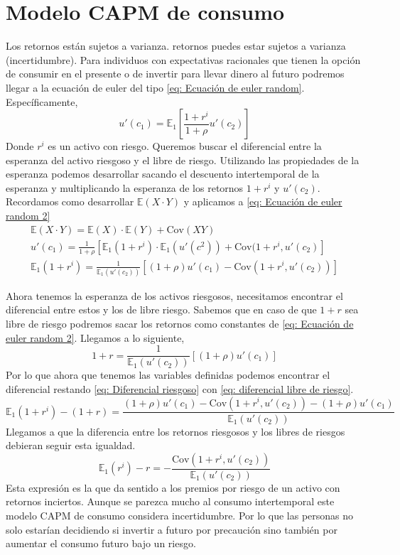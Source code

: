\section{Modelo CAPM de consumo}
Los retornos están sujetos a varianza. retornos puedes estar sujetos a varianza (incertidumbre). Para individuos con expectativas racionales que tienen la opción de consumir en el presente o de invertir para llevar dinero al futuro podremos llegar a la ecuación de euler del tipo \ref{eq: Ecuación de euler random}. Específicamente,
\begin{equation}
    u'(c_1) = \mathbb{E}_1  \left[  \frac{1+r^i}{1+\rho} u'(c_2)  \right] \label{eq: Ecuación de euler random 2}
\end{equation}
Donde $r^i$ es un activo con riesgo. Queremos buscar el diferencial entre la esperanza del activo riesgoso y el libre de riesgo. Utilizando las propiedades de la esperanza podemos desarrollar sacando el descuento intertemporal de la esperanza y multiplicando la esperanza de los retornos $1+r^i$ y $u'(c_2)$. Recordamos como desarrollar $\mathbb{E}(X\cdot Y)$ y aplicamos a \ref{eq: Ecuación de euler random 2}
\begin{align}
    \mathbb{E}(X\cdot Y) = \mathbb{E}(X) \cdot \mathbb{E}(Y) + \text{Cov}(XY) \\
    u'(c_1) = \frac{1}{1+\rho} \left[ \mathbb{E}_1(1+r^i) \cdot \mathbb{E}_1 (u'(c^2)) + \text{Cov}(1 + r^i, u'(c_2)       \right] \\
    \mathbb{E}_1 (1+r^i) = \frac {1}{\mathbb{E}_1 (u'(c_2))} \left[   (1+\rho)u'(c_1) - \text{Cov}(1+r^i, u'(c_2))     \right] \label{eq: Diferencial riesgoso}
\end{align}

Ahora tenemos la esperanza de los activos riesgosos, necesitamos encontrar el diferencial entre estos y los de libre riesgo. Sabemos que en caso de que $1+r$ sea libre de riesgo podremos sacar los retornos como constantes de  \ref{eq: Ecuación de euler random 2}. Llegamos a lo siguiente,
\begin{equation}
    1+r = \frac{1}{\mathbb{E}_1 (u'(c_2))} [(1+\rho)u'(c_1)] \label{eq: diferencial libre de riesgo}
\end{equation}
Por lo que ahora que tenemos las variables definidas podemos encontrar el diferencial restando \ref{eq: Diferencial riesgoso} con \ref{eq: diferencial libre de riesgo}. 
\begin{equation*}
    \mathbb{E}_1 (1+r^i) - (1+r) = \frac {(1+\rho)u'(c_1) - \text{Cov}(1+r^i, u'(c_2)) - (1+\rho)u'(c_1) }{\mathbb{E}_1 (u'(c_2))}  
\end{equation*}
Llegamos a que la diferencia entre los retornos riesgosos y los libres de riesgos debieran seguir esta igualdad.
\begin{equation}
    \mathbb{E}_1(r^i) - r = - \frac{\text{Cov}(1+r^i, u'(c_2))}{\mathbb{E}_1(u'(c_2))}
\end{equation}
Esta expresión es la que da sentido a los premios por riesgo de un activo con retornos inciertos. Aunque se parezca mucho al consumo intertemporal este modelo CAPM de consumo considera incertidumbre. Por lo que las personas no solo estarían decidiendo si invertir a futuro por precaución sino también por aumentar el consumo futuro bajo un riesgo. 

